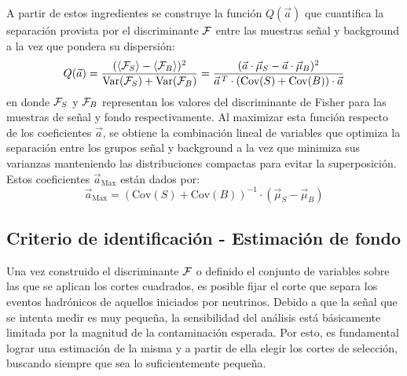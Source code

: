 	A partir de estos ingredientes se construye la función $Q(\vec{a})$ que cuantifica la separación provista por el discriminante $\cal{F}$
	entre las muestras señal y background a la vez que pondera su dispersión:
	\begin{equation}
	Q(\vec{a}) = \frac{( \langle{\cal F}_S\rangle - \langle{\cal F}_B \rangle)^2}{\text{Var}({\cal F}_S)+\text{Var}({\cal F}_B)}
	= \frac{(\vec{a}\cdot\vec{\mu}_S  - \vec{a}\cdot\vec{\mu}_B)^2}
					{\vec{a}^{\,T} \cdot (\text{Cov}(S) + \text{Cov}(B) )\cdot\vec{a}} 
	\end{equation}
	en donde ${\cal F}_S$ y ${\cal F}_B$ representan los valores del discriminante de Fisher para las muestras de señal y fondo respectivamente.
	Al maximizar esta función respecto de los coeficientes $\vec{a}$, se obtiene la combinación lineal de variables que optimiza la separación entre los grupos señal y background a la vez que minimiza sus varianzas manteniendo las distribuciones compactas para evitar la superposición. 
	Estos coeficientes $\vec{a}_{\text{Max}}$ están dados por:
	\begin{equation}
	\vec{a}_{\text{Max}} = (\text{Cov}(S) + \text{Cov}(B) )^{-1} \cdot (\vec{\mu}_S - \vec{\mu}_B)   
	\end{equation}
	
	
	\subsection{Criterio de identificación - Estimación de fondo}
	\label{sbsc:fondo}
	
	Una vez construido el discriminante ${\cal F}$ o definido el conjunto de variables sobre las que se aplican los cortes cuadrados, es posible fijar el corte que separa los eventos hadrónicos de aquellos iniciados por neutrinos.
	Debido a que la señal que se intenta medir es muy pequeña, la sensibilidad del análisis está básicamente limitada por la magnitud de la contaminación esperada.
	Por esto, es fundamental lograr una estimación de la misma y a partir de ella elegir los cortes de selección, buscando siempre que sea lo suficientemente pequeña.
	
